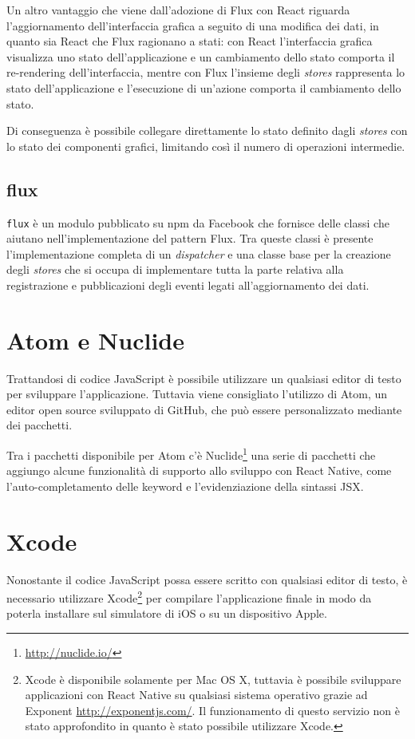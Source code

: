 Un altro vantaggio che viene dall'adozione di Flux con React riguarda l'aggiornamento dell'interfaccia grafica a seguito di una modifica dei dati, in quanto sia React che Flux ragionano a stati: con React l'interfaccia grafica visualizza uno stato dell'applicazione e un cambiamento dello stato comporta il re-rendering dell'interfaccia, mentre con Flux l'insieme degli \textit{stores} rappresenta lo stato dell'applicazione e l'esecuzione di un'azione comporta il cambiamento dello stato.

Di conseguenza è possibile collegare direttamente lo stato definito dagli \textit{stores} con lo stato dei componenti grafici, limitando così il numero di operazioni intermedie.

\subsection{flux}\label{sec:flux-npm}

\texttt{flux} è un modulo pubblicato su npm da Facebook che fornisce delle classi che aiutano nell'implementazione del pattern Flux.
Tra queste classi è presente l'implementazione completa di un \textit{dispatcher} e una classe base per la creazione degli \textit{stores} che si occupa di implementare tutta la parte relativa alla registrazione e pubblicazioni degli eventi legati all'aggiornamento dei dati.

\section{Atom e Nuclide}

Trattandosi di codice JavaScript è possibile utilizzare un qualsiasi editor di testo per sviluppare l'applicazione.
Tuttavia viene consigliato l'utilizzo di Atom, un editor open source sviluppato di GitHub, che può essere personalizzato mediante dei pacchetti.

Tra i pacchetti disponibile per Atom c'è Nuclide\footnote{\url{http://nuclide.io/}} una serie di pacchetti che aggiungo alcune funzionalità di supporto allo sviluppo con React Native, come l'auto-completamento delle keyword e l'evidenziazione della sintassi JSX.

\section{Xcode}

Nonostante il codice JavaScript possa essere scritto con qualsiasi editor di testo, è necessario utilizzare Xcode\footnote{Xcode è disponibile solamente per Mac OS X, tuttavia è possibile sviluppare applicazioni con React Native su qualsiasi sistema operativo grazie ad Exponent \url{http://exponentjs.com/}. Il funzionamento di questo servizio non è stato approfondito in quanto è stato possibile utilizzare Xcode.} per compilare l'applicazione finale in modo da poterla installare sul simulatore di iOS o su un dispositivo Apple.

